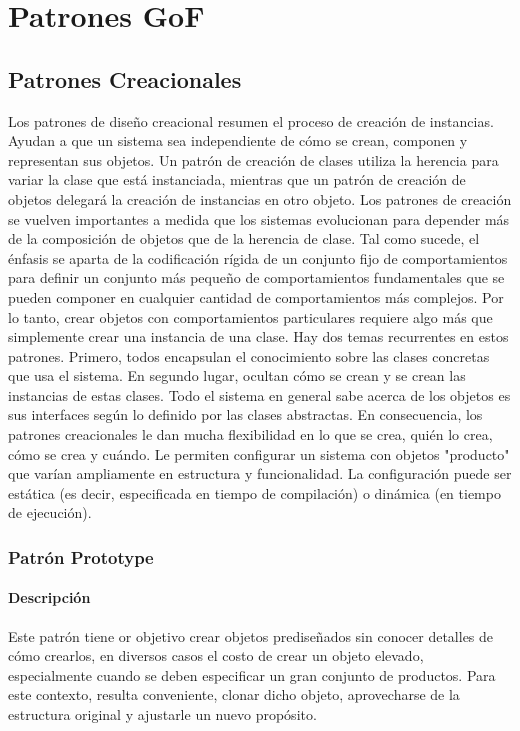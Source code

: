 \chapter{Patrones GoF}
\section{Patrones Creacionales}
Los patrones de diseño creacional resumen el proceso de creación de instancias. Ayudan a que un sistema sea independiente de cómo se crean, componen y representan sus objetos. Un patrón de creación de clases utiliza la herencia para variar la clase que está instanciada, mientras que un patrón de creación de objetos delegará la creación de instancias en otro objeto. Los patrones de creación se vuelven importantes a medida que los sistemas evolucionan para depender más de la composición de objetos que de la herencia de clase. Tal como sucede, el énfasis se aparta de la codificación rígida de un conjunto fijo de comportamientos para definir un conjunto más pequeño de comportamientos fundamentales que se pueden componer en cualquier cantidad de comportamientos más complejos. Por lo tanto, crear objetos con comportamientos particulares requiere algo más que simplemente crear una instancia de una clase. Hay dos temas recurrentes en estos patrones. Primero, todos encapsulan el conocimiento sobre las clases concretas que usa el sistema. En segundo lugar, ocultan cómo se crean y se crean las instancias de estas clases. Todo el sistema en general sabe acerca de los objetos es sus interfaces según lo definido por las clases abstractas. En consecuencia, los patrones creacionales le dan mucha flexibilidad en lo que se crea, quién lo crea, cómo se crea y cuándo. Le permiten configurar un sistema con objetos "producto" que varían ampliamente en estructura y funcionalidad. La configuración puede ser estática (es decir, especificada en tiempo de compilación) o dinámica (en tiempo de ejecución).\cite{gof}
\subsection{Patrón Prototype}
\subsubsection{Descripción}
Este patrón tiene or objetivo crear objetos prediseñados sin conocer detalles de cómo crearlos, en diversos casos el costo de crear un objeto elevado, especialmente cuando se deben especificar un gran conjunto de productos. Para este contexto, resulta conveniente, clonar dicho objeto, aprovecharse de la estructura original y ajustarle un nuevo propósito. 

